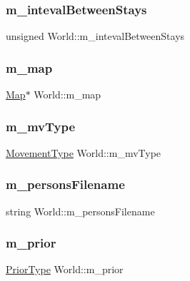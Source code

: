 \subsubsection{\texorpdfstring{m\_intevalBetweenStays}{m\_intevalBetweenStays}}
{\footnotesize\ttfamily unsigned World\+::m\+\_\+inteval\+Between\+Stays\hspace{0.3cm}{\ttfamily [private]}}

\mbox{\label{class_world_ae1e6f62c5b282e94ffdcaab58fcb3fb4}} 
\subsubsection{\texorpdfstring{m\_map}{m\_map}}
{\footnotesize\ttfamily \mbox{\hyperlink{class_map}{Map}}$\ast$ World\+::m\+\_\+map\hspace{0.3cm}{\ttfamily [private]}}

\mbox{\label{class_world_a9fcf012ce7262edf5646f0720ffd7666}} 
\subsubsection{\texorpdfstring{m\_mvType}{m\_mvType}}
{\footnotesize\ttfamily \mbox{\hyperlink{_movement_type_8h_a8a93b61bc797a7d1907f42796a252493}{Movement\+Type}} World\+::m\+\_\+mv\+Type\hspace{0.3cm}{\ttfamily [private]}}

\mbox{\label{class_world_a66e68ec2220ea27e705aac88a920b6fd}} 
\subsubsection{\texorpdfstring{m\_personsFilename}{m\_personsFilename}}
{\footnotesize\ttfamily string World\+::m\+\_\+persons\+Filename\hspace{0.3cm}{\ttfamily [private]}}

\mbox{\label{class_world_af7fca82468f73094ec5ba75577b0d96a}} 
\subsubsection{\texorpdfstring{m\_prior}{m\_prior}}
{\footnotesize\ttfamily \mbox{\hyperlink{_prior_type_8h_a61286c562e68de246982fc393a7c23a5}{Prior\+Type}} World\+::m\+\_\+prior\hspace{0.3cm}{\ttfamily [private]}}

